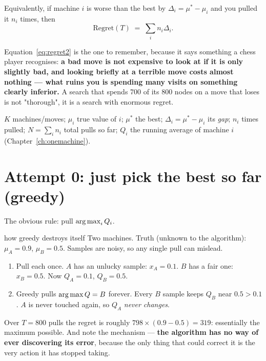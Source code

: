 Equivalently, if machine $i$ is worse than the best by $\Delta_i = \mu^{*} - \mu_i$ and you
pulled it $n_i$ times, then
\begin{equation}
  \label{eq:regret2}
  \text{Regret}(T) \;=\; \sum_{i} n_i \Delta_i .
\end{equation}

Equation~\eqref{eq:regret2} is the one to remember, because it says something a chess player
recognises: \textbf{a bad move is not expensive to look at if it is only slightly bad, and
looking briefly at a terrible move costs almost nothing --- what ruins you is spending many
visits on something clearly inferior.} A search that spends 700 of its 800 nodes on a move
that loses is not "thorough", it is a search with enormous regret.

\begin{notationbox}
$K$ machines/moves; $\mu_i$ true value of $i$; $\mu^*$ the best; $\Delta_i = \mu^* - \mu_i$
its \emph{gap}; $n_i$ times pulled; $N = \sum_i n_i$ total pulls so far; $Q_i$ the running
average of machine $i$ (Chapter~\ref{ch:onemachine}).
\end{notationbox}

\section{Attempt 0: just pick the best so far (greedy)}

The obvious rule: pull $\operatorname*{arg\,max}_i Q_i$.

\begin{worked}{how greedy destroys itself}
Two machines. Truth (unknown to the algorithm): $\mu_A = 0.9$, $\mu_B = 0.5$. Samples are
noisy, so any single pull can mislead.

\begin{enumerate}
\item Pull each once. $A$ has an unlucky sample: $x_A = 0.1$. $B$ has a fair one:
  $x_B = 0.5$. Now $Q_A = 0.1$, $Q_B = 0.5$.
\item Greedy pulls $\operatorname*{arg\,max} Q = B$ forever. Every $B$ sample keeps $Q_B$ near $0.5 > 0.1$.
  $A$ is never touched again, so $Q_A$ \emph{never changes}.
\end{enumerate}
Over $T = 800$ pulls the regret is roughly $798 \times (0.9-0.5) = 319$: essentially the
maximum possible. And note the mechanism --- \textbf{the algorithm has no way of ever
discovering its error}, because the only thing that could correct it is the very action it
has stopped taking.
\end{worked}

